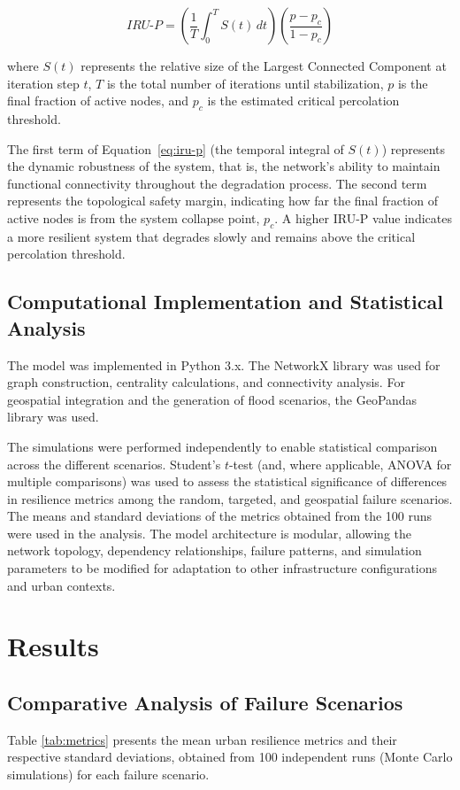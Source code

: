 \documentclass[journal]{IEEEtran}
\begin{document}
\begin{equation}
IRU\text{-}P =
\left(
\frac{1}{T}
\int_{0}^{T} S(t)\,dt
\right)
\left(
\frac{p-p_c}{1-p_c}
\right)
\label{eq:iru-p}
\end{equation}

where $S(t)$ represents the relative size of the Largest Connected Component at iteration step $t$, $T$ is the total number of iterations until stabilization, $p$ is the final fraction of active nodes, and $p_c$ is the estimated critical percolation threshold.

The first term of Equation~\ref{eq:iru-p} (the temporal integral of $S(t)$) represents the dynamic robustness of the system, that is, the network's ability to maintain functional connectivity throughout the degradation process. The second term represents the topological safety margin, indicating how far the final fraction of active nodes is from the system collapse point, $p_c$. A higher IRU-P value indicates a more resilient system that degrades slowly and remains above the critical percolation threshold.

\subsection{Computational Implementation and Statistical Analysis}
The model was implemented in Python 3.x. The NetworkX library was used for graph construction, centrality calculations, and connectivity analysis. For geospatial integration and the generation of flood scenarios, the GeoPandas library was used.

The simulations were performed independently to enable statistical comparison across the different scenarios. Student's $t$-test (and, where applicable, ANOVA for multiple comparisons) was used to assess the statistical significance of differences in resilience metrics among the random, targeted, and geospatial failure scenarios. The means and standard deviations of the metrics obtained from the 100 runs were used in the analysis. The model architecture is modular, allowing the network topology, dependency relationships, failure patterns, and simulation parameters to be modified for adaptation to other infrastructure configurations and urban contexts.


\section{Results}
\subsection{Comparative Analysis of Failure Scenarios}
Table \ref{tab:metrics} presents the mean urban resilience metrics and their respective standard deviations, obtained from 100 independent runs (Monte Carlo simulations) for each failure scenario.
\end{document}
